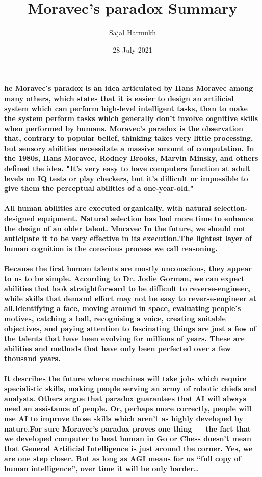 \documentclass{article}
\title{\vspace{-2cm}Moravec's paradox Summary}
\author{Sajal Harmukh }
\date{28 July 2021}
\begin{document}
	\maketitle 
	\paragraph{ he Moravec's paradox is an idea articulated by Hans Moravec among many others, which states that it is easier to design an artificial system which can perform high-level intelligent tasks, than to make the system perform tasks which generally don't involve cognitive skills when performed by humans. Moravec's paradox is the observation that, contrary to popular belief, thinking takes very little processing, but sensory abilities necessitate a massive amount of computation. In the 1980s, Hans Moravec, Rodney Brooks, Marvin Minsky, and others defined the idea. "It's very easy to have computers function at adult levels on IQ tests or play checkers, but it's difficult or impossible to give them the perceptual abilities of a one-year-old."}
	
	\paragraph{ All human abilities are executed organically, with natural selection-designed equipment. Natural selection has had more time to enhance the design of an older talent. Moravec In the future, we should not anticipate it to be very effective in its execution.The lightest layer of human cognition is the conscious process we call reasoning.}
	
	\paragraph{Because the first human talents are mostly unconscious, they appear to us to be simple. According to Dr. Jodie Gorman, we can expect abilities that look straightforward to be difficult to reverse-engineer, while skills that demand effort may not be easy to reverse-engineer at all.Identifying a face, moving around in space, evaluating people's motives, catching a ball, recognising a voice, creating suitable objectives, and paying attention to fascinating things are just a few of the talents that have been evolving for millions of years. These are abilities and methods that have only been perfected over a few thousand years.}
	
	\paragraph{ It describes the future where machines will take jobs which require specialistic skills, making people serving an army of robotic chiefs and analysts. Others argue that paradox guarantees that AI will always need an assistance of people. Or, perhaps more correctly, people will use AI to improve those skills which aren’t as highly developed by nature.For sure Moravec’s paradox proves one thing — the fact that we developed computer to beat human in Go or Chess doesn’t mean that General Artificial Intelligence is just around the corner. Yes, we are one step closer. But as long as AGI means for us “full copy of human intelligence”, over time it will be only harder..}
	
\end{document}
